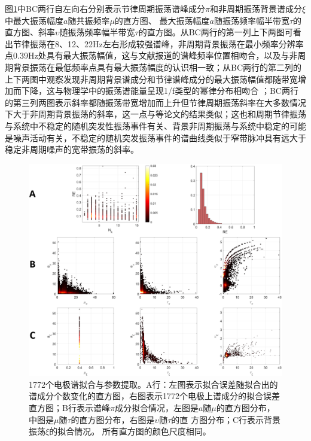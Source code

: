 图\ref{7:para}中BC两行自左向右分别表示节律周期振荡谱峰成分$\pi$和非周期振荡背景谱成分$\xi$中最大振荡幅度$a$随共振频率$\mu$的直方图、
最大振荡幅度$a$随振荡频率幅半带宽$\tau$的直方图、斜率$\upsilon$随振荡频率幅半带宽$\tau$的直方图。从BC两行的第一列上下两图可看出节律振荡在8、12、22Hz左右形成较强谱峰，非周期背景振荡在最小频率分辨率点0.39Hz处具有最大振荡幅值，这与文献\cite{frauscher2018atlas}报道的谱峰频率位置相吻合，以及与非周期背景振荡在最低频率点具有最大振荡幅度的认识相一致；从BC两行的第二列的上下两图中观察发现非周期背景谱成分和节律谱峰成分的最大振荡幅值都随带宽增加而下降，这与物理学中的振荡谱能量呈现1/f类型的幂律分布相吻合
；BC两行的第三列两图表示斜率都随振荡带宽增加而上升但节律周期振荡斜率在大多数情况下大于非周期背景振荡的斜率，这一点与\cite{pascual1988parametric,amador1989structure,amador1990spatiotemporal}等论文的结果类似；这也和周期节律振荡与系统中不稳定的随机突发性振荡事件有关、背景非周期振荡与系统中稳定的可能是噪声活动有关，不稳定的随机突发振荡事件的谱曲线类似于窄带脉冲具有远大于稳定非周期噪声的宽带振荡的斜率。
\begin{figure}[!h]
\includegraphics[width=15cm]{pic/xipi/para.png}
\caption{1772个电极谱拟合与参数提取。A行：左图表示拟合误差随拟合出的谱成分个数变化的直方图，右图表示1772个电极上谱成分的拟合误差直方图；B行表示谱峰$\pi$成分拟合情况，左图是$a$随$\mu$的直方图分布，中图是$\mu$随$\tau$的直方图分布，右图是$\upsilon$随$\tau$的直
方图分布；C行表示背景振荡$\xi$的拟合情况。 所有直方图的颜色尺度相同。}
\label{7:para}
\end{figure}

